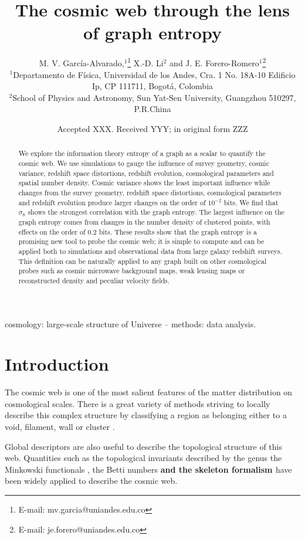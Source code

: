 \documentclass[fleqn,usenatbib]{mnras}
\title[Cosmic Web Graph Entropy]{The cosmic web through the lens of graph entropy}
\author[Garc\'ia-Alvarado et al.]{
M. V. Garc\'ia-Alvarado,$^{1}$\thanks{E-mail: mv.garcia@uniandes.edu.co}
X.-D. Li$^{2}$
and J. E. Forero-Romero$^{1}$\thanks{E-mail: je.forero@uniandes.edu.co}
\\
$^{1}$Departamento de F\'isica, Universidad de los Andes, Cra. 1 No. 18A-10 Edificio Ip, CP 111711, Bogot\'a, Colombia\\
$^{2}$School of Physics and Astronomy, Sun Yat-Sen University, Guangzhou 510297, P.R.China\\
}
\date{Accepted XXX. Received YYY; in original form ZZZ}
\begin{document}
\label{firstpage}
\pagerange{\pageref{firstpage}--\pageref{lastpage}}
\maketitle

\begin{abstract}
  We explore the information theory entropy of a graph as a scalar to quantify the cosmic web.
  We use simulations to gauge the influence of survey geometry, cosmic variance, 
  redshift space distortions, redshift evolution, cosmological parameters and 
  spatial number density. 
   Cosmic variance shows the least important influence while
   changes from the survey geometry, redshift space distortions, cosmological 
   parameters and redshift evolution produce larger changes on the
   order of $10^{-2}$ bits.
   We find that $\sigma_8$ shows the strongest correlation with the graph entropy.
   The largest influence on the graph entropy comes from changes in the 
   number density of clustered points, with effects on the order of $0.2$ bits.
   These results show that the graph entropy is a promising new tool to probe the cosmic 
   web; it is simple to compute and can be applied both to simulations and observational data 
   from large galaxy redshift surveys.
   This definition can be naturally applied to any graph built on other cosmological 
   probes such as cosmic microwave background maps, weak lensing maps or reconstructed
   density and peculiar velocity fields.
   \end{abstract}
\begin{keywords}
cosmology: large-scale structure of Universe -- methods: data analysis.
\end{keywords}


\section{Introduction}

The cosmic web is one of the most salient features of the matter distribution
on cosmological scales. 
There is a great variety of methods striving to locally describe this complex 
structure by classifying a region as belonging either
to a void, filament, wall or cluster \textbf{\citep{2018MNRAS.473.1195L, 2011MNRAS.414..350S}}.

Global descriptors are also useful to describe the topological structure of this web.
Quantities such as the topological invariants described by  the genus
\citep{1986ApJ...309....1H, 1986ApJ...306..341G} the Minkowski functionals 
\citep{1997ApJ...482L...1S}, the Betti numbers
\citep{2013JKAS...46..125P,2017MNRAS.465.4281P}  \textbf{and the skeleton formalism \citep{2008MNRAS.383.1655S}} have been widely applied to describe the
cosmic web.
\end{document}
